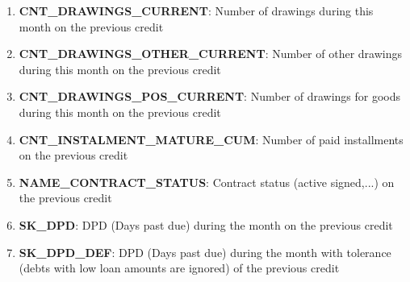 \documentclass[12pt, letterpaper]{article}
\begin{document}
\begin{appendices}
\begin{enumerate}
  \item \textbf{CNT_DRAWINGS_CURRENT}: Number of drawings during this month on the previous credit
  \item \textbf{CNT_DRAWINGS_OTHER_CURRENT}: Number of other drawings during this month on the previous credit
  \item \textbf{CNT_DRAWINGS_POS_CURRENT}: Number of drawings for goods during this month on the previous credit
  \item \textbf{CNT_INSTALMENT_MATURE_CUM}: Number of paid installments on the previous credit
  \item \textbf{NAME_CONTRACT_STATUS}: Contract status (active signed,...) on the previous credit
  \item \textbf{SK_DPD}: DPD (Days past due) during the month on the previous credit
  \item \textbf{SK_DPD_DEF}: DPD (Days past due) during the month with tolerance (debts with low loan amounts are ignored) of the previous credit
\end{enumerate}

\end{appendices}

\printbibliography
\end{document}
